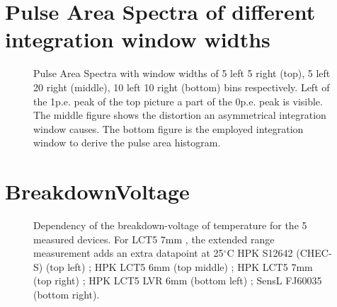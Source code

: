 \documentclass[12pt,article,type=msc,colorback,accentcolor=tud9c]{tudthesis}
\begin{document}
{\clearpage
\section{Pulse Area Spectra of different integration window widths}
\label{subsec:PAS_window}

\begin{figure}[h]
\centering
\label{app:PAS_window}
\end{figure}

\begin{figure}[h]
\ContinuedFloat
\begin{centering}
\caption{Pulse Area Spectra with window widths of 5 left 5 right (top), 5 left 20 right (middle), 10 left 10 right (bottom) bins respectively. Left of the 1p.e. peak of the top picture a part of the 0p.e. peak is visible. The middle figure shows the distortion an asymmetrical integration window causes. The bottom figure is the employed integration window to derive the pulse area histogram.}
\label{app:PAS_window}
\end{centering}
\end{figure}





\clearpage
\section{BreakdownVoltage}
\begin{figure}[h]
\begin{centering}
\caption{Dependency of the breakdown-voltage of temperature for the 5 measured devices. For LCT5 7mm , the extended range measurement adds an extra datapoint at 25$^\circ$C HPK S12642 (CHEC-S) (top left) ; HPK LCT5 6mm (top middle) ; HPK LCT5 7mm (top right) ; HPK LCT5 LVR 6mm (bottom left) ; SensL FJ60035 (bottom right).}
\label{app:Device_Vbr}
\end{centering}
\end{figure}

}
\end{document}
